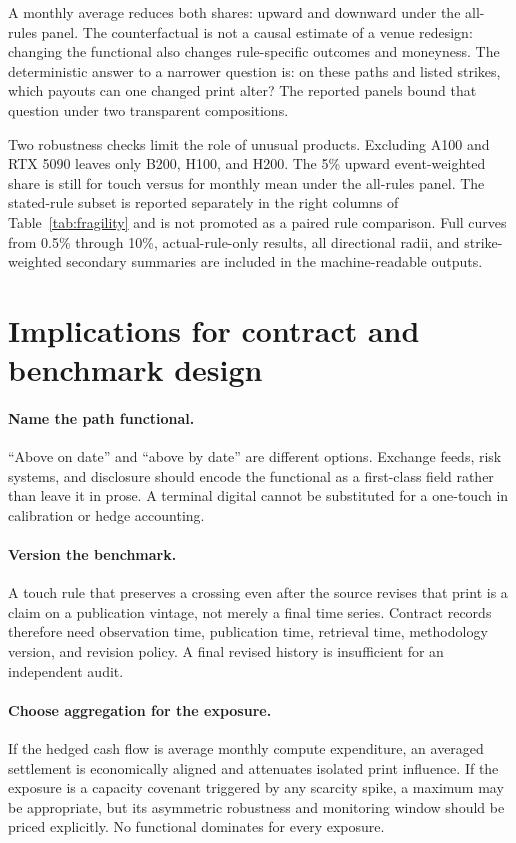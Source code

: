 \documentclass[10pt,twocolumn]{article}
\begin{document}
A monthly average reduces both shares: \MeanFiveFPAll{} upward and \MeanFiveFNAll{}
downward under the all-rules panel. The counterfactual is not a causal
estimate of a venue redesign: changing the functional also changes
rule-specific outcomes and moneyness. The deterministic answer to a narrower
question is: on these
paths and listed strikes, which payouts can one changed print alter? The
reported panels bound that question under two transparent compositions.

Two robustness checks limit the role of unusual products. Excluding A100 and
RTX 5090 leaves only B200, H100, and H200. The 5\% upward event-weighted share is
still \CoreTouchFiveFP{} for touch versus \CoreMeanFiveFP{} for monthly mean
under the all-rules panel. The stated-rule subset is reported separately in the
right columns of Table~\ref{tab:fragility} and is not promoted as a paired rule
comparison.
Full curves from 0.5\% through 10\%, actual-rule-only results, all
directional radii, and strike-weighted secondary summaries are included in
the machine-readable outputs.

\section{Implications for contract and benchmark design}

\paragraph{Name the path functional.}
``Above on date'' and ``above by date'' are different options. Exchange feeds,
risk systems, and disclosure should encode the functional as a first-class
field rather than leave it in prose. A terminal digital cannot be substituted
for a one-touch in calibration or hedge accounting.

\paragraph{Version the benchmark.}
A touch rule that preserves a crossing even after the source revises that print
is a claim on a publication vintage, not merely a final time series. Contract
records therefore need observation time, publication time, retrieval time,
methodology version, and revision policy. A final revised history is
insufficient for an independent audit.

\paragraph{Choose aggregation for the exposure.}
If the hedged cash flow is average monthly compute expenditure, an averaged
settlement is economically aligned and attenuates isolated print influence. If
the exposure is a capacity covenant triggered by any scarcity spike, a maximum
may be appropriate, but its asymmetric robustness and monitoring window should
be priced explicitly. No functional dominates for every exposure.
\end{document}
